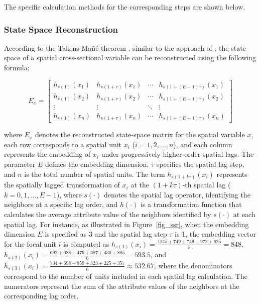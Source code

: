\documentclass[authoryear,preprint,review,12pt]{elsarticle}
\begin{document}
The specific calculation methods for the corresponding steps are shown below.

\subsubsection{State Space Reconstruction}

According to the Takens-Ma{\~n}{\'e} theorem \citep{Takens1981embedding,Mane1981embedding}, similar to the approach of \cite{gao2023gccm}, the state space of a spatial cross-sectional variable can be reconstructed using the following formula:

\begin{equation}\label{eq-embedding}
E_x = \begin{bmatrix}
h_{s(1)}(x_1) & h_{s(1+\tau)}(x_1) & \cdots & h_{s(1+(E-1)\tau)}(x_1) \\
h_{s(1)}(x_2) & h_{s(1+\tau)}(x_2) & \cdots & h_{s(1+(E-1)\tau)}(x_2) \\
\vdots & \vdots & \ddots & \vdots \\
h_{s(1)}(x_n) & h_{s(1+\tau)}(x_n) & \cdots & h_{s(1+(E-1)\tau)}(x_n)
\end{bmatrix}
\end{equation}

\noindent where \(E_x\) denotes the reconstructed state-space matrix for the spatial variable \(x\), each row corresponds to a spatial unit \(x_i\) (\(i = 1, 2, \ldots, n\)), and each column represents the embedding of \(x_i\) under progressively higher-order spatial lags. The parameter \(E\) defines the embedding dimension, \(\tau\) specifies the spatial lag step, and \(n\) is the total number of spatial units. The term \(h_{s(1+k\tau)}(x_i)\) represents the spatially lagged transformation of \(x_i\) at the \((1+k\tau)\)-th spatial lag (\(k = 0, 1, \ldots, E-1\)), where \(s(\cdot)\) denotes the spatial lag operator, identifying the neighbors at a specific lag order, and \(h(\cdot)\) is a transformation function that calculates the average attribute value of the neighbors identified by \(s(\cdot)\) at each spatial lag. For instance, as illustrated in Figure~\ref{fig_ssr}, when the embedding dimension \(E\) is specified as 3 and the spatial lag step \(\tau\) is 1, the embedding vector for the focal unit \(i\) is computed as \(h_{s(1)}(x_i) = \frac{1145 + 749 + 749 + 972 + 625}{5} = 848\), \(h_{s(2)}(x_i) = \frac{692 + 688 + 479 + 387 + 430 + 885}{6} = 593.5\), and \(h_{s(3)}(x_i) = \frac{734 + 698 + 859 + 323 + 225 + 357}{6} \approx 532.67\), where the denominators correspond to the number of units included in each spatial lag calculation. The numerators represent the sum of the attribute values of the neighbors at the corresponding lag order.
\end{document}
